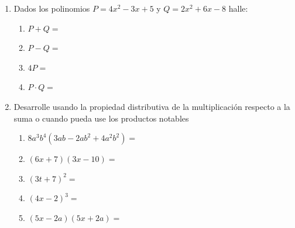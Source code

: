 \documentclass[letterpaper,fleqn]{article}
\begin{document}
\begin{enumerate}
\begin{enumerate}
\end{enumerate}
\newpage
\item Dados los polinomios $P=4x^{2}-3x+5$ \hspace{24pt} y \hspace{24pt} $Q=2x^{2}+6x-8$ halle:
\begin{enumerate}
 \item $P+Q=$\noanswer
 \item $P-Q=$\noanswer
 \item $4P=$\noanswer
 \item $P\cdot Q=$\noanswer
\end{enumerate}
\item Desarrolle usando la propiedad distributiva de la multiplicación respecto a la suma o cuando pueda use los productos notables
\begin{enumerate}
 \item $8a^{3}b^{4}(3ab-2ab^{2}+4a^{2}b^{2})=$\noanswer
 \item $(6x+7)(3x-10)=$\noanswer
 \item $(3t+7)^{2}=$\noanswer
 \item $(4x-2)^{3}=$\noanswer
 \item $(5x-2a)(5x+2a)=$\noanswer
\end{enumerate}
 \end{enumerate}
\end{document}
